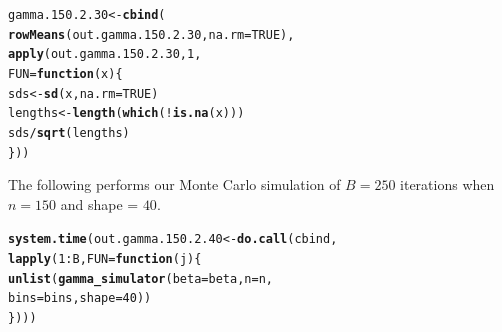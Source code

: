 \documentclass[11pt]{article}\usepackage[]{graphicx}\usepackage[]{color}
\makeatletter
\newcommand{\hlnum}[1]{\textcolor[rgb]{0.686,0.059,0.569}{#1}}%
\newcommand{\hlopt}[1]{\textcolor[rgb]{0,0,0}{#1}}%
\newcommand{\hlstd}[1]{\textcolor[rgb]{0.345,0.345,0.345}{#1}}%
\newcommand{\hlkwa}[1]{\textcolor[rgb]{0.161,0.373,0.58}{\textbf{#1}}}%
\newcommand{\hlkwb}[1]{\textcolor[rgb]{0.69,0.353,0.396}{#1}}%
\newcommand{\hlkwc}[1]{\textcolor[rgb]{0.333,0.667,0.333}{#1}}%
\newcommand{\hlkwd}[1]{\textcolor[rgb]{0.737,0.353,0.396}{\textbf{#1}}}%
\newenvironment{kframe}{%
 \def\at@end@of@kframe{}%
 \ifinner\ifhmode%
  \def\at@end@of@kframe{\end{minipage}}%
  \begin{minipage}{\columnwidth}%
 \fi\fi%
 \def\FrameCommand##1{\hskip\@totalleftmargin \hskip-\fboxsep
 \colorbox{shadecolor}{##1}\hskip-\fboxsep
     \hskip-\linewidth \hskip-\@totalleftmargin \hskip\columnwidth}%
 \MakeFramed {\advance\hsize-\width
   \@totalleftmargin\z@ \linewidth\hsize
   \@setminipage}}%
 {\par\unskip\endMakeFramed%
 \at@end@of@kframe}
\newenvironment{knitrout}{}{} %
\makeatother
\begin{document}
\begin{knitrout}
\color{fgcolor}\begin{kframe}
\begin{alltt}
\hlstd{gamma.150.2.30} \hlkwb{<-} \hlkwd{cbind}\hlstd{(}
  \hlkwd{rowMeans}\hlstd{(out.gamma.150.2.30,} \hlkwc{na.rm} \hlstd{=} \hlnum{TRUE}\hlstd{),}
  \hlkwd{apply}\hlstd{(out.gamma.150.2.30,} \hlnum{1}\hlstd{,}
  \hlkwc{FUN} \hlstd{=} \hlkwa{function}\hlstd{(}\hlkwc{x}\hlstd{)\{}
    \hlstd{sds} \hlkwb{<-} \hlkwd{sd}\hlstd{(x,} \hlkwc{na.rm} \hlstd{=} \hlnum{TRUE}\hlstd{)}
    \hlstd{lengths} \hlkwb{<-} \hlkwd{length}\hlstd{(}\hlkwd{which}\hlstd{(}\hlopt{!}\hlkwd{is.na}\hlstd{(x)))}
    \hlstd{sds} \hlopt{/} \hlkwd{sqrt}\hlstd{(lengths)}
  \hlstd{\}))}
\end{alltt}


{\ttfamily\noindent\bfseries\color{errorcolor}{\#\# Error in is.data.frame(x): object 'out.gamma.150.2.30' not found}}\end{kframe}
\end{knitrout}

The following performs our Monte Carlo simulation of $B = 250$ iterations 
when $n = 150$ and shape = $40$.

\begin{knitrout}
\color{fgcolor}\begin{kframe}
\begin{alltt}
\hlkwd{system.time}\hlstd{(out.gamma.150.2.40} \hlkwb{<-} \hlkwd{do.call}\hlstd{(cbind,}
  \hlkwd{lapply}\hlstd{(}\hlnum{1}\hlopt{:}\hlstd{B,} \hlkwc{FUN} \hlstd{=} \hlkwa{function}\hlstd{(}\hlkwc{j}\hlstd{)\{}
    \hlkwd{unlist}\hlstd{(}\hlkwd{gamma_simulator}\hlstd{(}\hlkwc{beta} \hlstd{= beta,} \hlkwc{n} \hlstd{= n,}
      \hlkwc{bins} \hlstd{= bins,} \hlkwc{shape} \hlstd{=} \hlnum{40}\hlstd{))}
\hlstd{\})))}
\end{alltt}


{\ttfamily\noindent\bfseries\color{errorcolor}{\#\# Error in eval(predvars, data, env): object 'x1' not found}}

{\ttfamily\noindent\itshape\color{messagecolor}{\#\# Timing stopped at: 0.003 0 0.003}}\end{kframe}
\end{knitrout}
\end{document}
